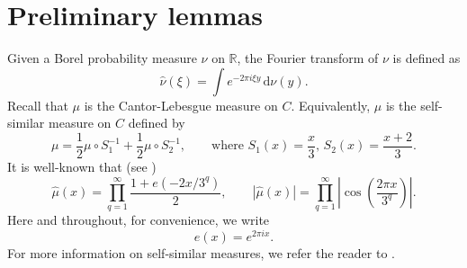 \documentclass[10pt,a4paper]{amsart}
\numberwithin{equation}{section} %
\newcommand{\R}{\mathbb{R}}
\begin{document}
\section{Preliminary lemmas}\label{S2Preliminary}

Given a Borel probability measure $\nu$ on $\R$, the Fourier transform of $\nu$ is defined as 
\[\widehat\nu(\xi)=\int e^{-2\pi i \xi y}\,\mathrm{d}\nu(y).\]
Recall that $\mu$ is the Cantor-Lebesgue measure on $C$. Equivalently, $\mu$ is  the self-similar measure on $C$ defined by
\[
\mu = \frac12 \mu\circ S_1^{-1} + \frac12 \mu\circ S_2^{-1},
\qquad \text{where }
S_1(x)=\frac{x}{3},\, S_2(x)=\frac{x+2}{3}.
\]
It is well-known that  (see \cite[page 342]{Strichartz1993})
\begin{equation*}\label{eq:fourier-product}
	\widehat\mu(x)
	= \prod_{q=1}^{\infty} \frac{1+e(-2x/3^q)}{2},
	\qquad
	|\widehat\mu(x)|
	= \prod_{q=1}^{\infty}\left|\cos\left(\frac{2\pi x}{3^q}\right)\right|.
\end{equation*}
Here and throughout, for convenience, we write 
\[e(x)=e^{2\pi i x}.\]
For more information on  self-similar measures,  we refer the reader to \cite{Falconer14}. 
\end{document}
